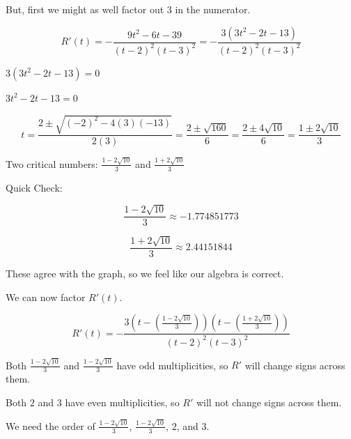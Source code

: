 \documentclass{ximera}
\begin{document}
But, first we might as well factor out $3$ in the numerator. 







\[   
R'(t) = -\frac{9 t^2 -6 t -39}{(t-2)^2 (t-3)^2} = -\frac{3 (3 t^2 - 2 t - 13)}{(t-2)^2 (t-3)^2}
\]




$3 (3 t^2 - 2 t - 13) = 0$ 

$3 t^2 - 2 t - 13 = 0$ 



\[
t = \frac{2 \pm \sqrt{(-2)^2 - 4(3)(-13)}}{2(3)} = \frac{2 \pm \sqrt{160}}{6} = \frac{2 \pm 4 \sqrt{10}}{6} = \frac{1 \pm 2 \sqrt{10}}{3}
\]




Two critical numbers: $\frac{1 - 2 \sqrt{10}}{3}$ and $\frac{1 + 2 \sqrt{10}}{3}$ 




Quick Check:  


\[
\frac{1 - 2 \sqrt{10}}{3} \approx -1.774851773
\]


\[
\frac{1 + 2 \sqrt{10}}{3} \approx 2.44151844
\]


These agree with the graph, so we feel like our algebra is correct. 



We can now factor $R'(t)$. 








\[   
R'(t) = -\frac{3 \left(t - \left(\frac{1 - 2 \sqrt{10}}{3} \right) \right) \left(t - \left(\frac{1 + 2 \sqrt{10}}{3} \right) \right) }{ (t-2)^2 (t-3)^2 } 
\]


Both $\frac{1 - 2 \sqrt{10}}{3}$ and $\frac{1 - 2 \sqrt{10}}{3}$ have odd multiplicities, so $R'$ will change signs across them. 




Both $2$ and $3$ have even multiplicities, so $R'$ will not change signs across them. 



We need the order of $\frac{1 - 2 \sqrt{10}}{3}$, $\frac{1 - 2 \sqrt{10}}{3}$, $2$, and $3$.   
\end{document}
